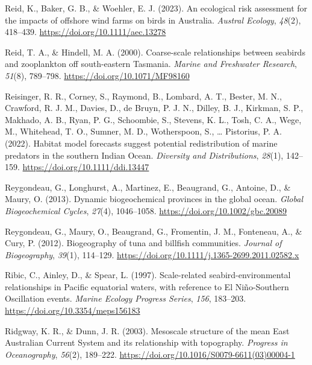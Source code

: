 \documentclass{article}
\newlength{\cslhangindent}
\newlength{\cslentryspacingunit} %
\newenvironment{CSLReferences}[2] %
 {%
  \setlength{\parindent}{0pt}
  \ifodd #1
  \let\oldpar\par
  \def\par{\hangindent=\cslhangindent\oldpar}
  \fi
  \setlength{\parskip}{#2\cslentryspacingunit}
 }%
 {}
\begin{document}
\begin{linenumbers}
\begin{CSLReferences}{1}{0}
\leavevmode{}%
Reid, K., Baker, G. B., \& Woehler, E. J. (2023). An ecological risk assessment for the impacts of offshore wind farms on birds in Australia. \emph{Austral Ecology}, \emph{48}(2), 418--439. \url{https://doi.org/10.1111/aec.13278}

\leavevmode{}%
Reid, T. A., \& Hindell, M. A. (2000). Coarse-scale relationships between seabirds and zooplankton off south-eastern Tasmania. \emph{Marine and Freshwater Research}, \emph{51}(8), 789--798. \url{https://doi.org/10.1071/MF98160}

\leavevmode{}%
Reisinger, R. R., Corney, S., Raymond, B., Lombard, A. T., Bester, M. N., Crawford, R. J. M., Davies, D., de Bruyn, P. J. N., Dilley, B. J., Kirkman, S. P., Makhado, A. B., Ryan, P. G., Schoombie, S., Stevens, K. L., Tosh, C. A., Wege, M., Whitehead, T. O., Sumner, M. D., Wotherspoon, S., \ldots{} Pistorius, P. A. (2022). Habitat model forecasts suggest potential redistribution of marine predators in the southern Indian Ocean. \emph{Diversity and Distributions}, \emph{28}(1), 142--159. \url{https://doi.org/10.1111/ddi.13447}

\leavevmode{}%
Reygondeau, G., Longhurst, A., Martinez, E., Beaugrand, G., Antoine, D., \& Maury, O. (2013). Dynamic biogeochemical provinces in the global ocean. \emph{Global Biogeochemical Cycles}, \emph{27}(4), 1046--1058. \url{https://doi.org/10.1002/gbc.20089}

\leavevmode{}%
Reygondeau, G., Maury, O., Beaugrand, G., Fromentin, J. M., Fonteneau, A., \& Cury, P. (2012). Biogeography of tuna and billfish communities. \emph{Journal of Biogeography}, \emph{39}(1), 114--129. \url{https://doi.org/10.1111/j.1365-2699.2011.02582.x}

\leavevmode{}%
Ribic, C., Ainley, D., \& Spear, L. (1997). Scale-related seabird-environmental relationships in Pacific equatorial waters, with reference to El Niño-Southern Oscillation events. \emph{Marine Ecology Progress Series}, \emph{156}, 183--203. \url{https://doi.org/10.3354/meps156183}

\leavevmode{}%
Ridgway, K. R., \& Dunn, J. R. (2003). Mesoscale structure of the mean East Australian Current System and its relationship with topography. \emph{Progress in Oceanography}, \emph{56}(2), 189--222. \url{https://doi.org/10.1016/S0079-6611(03)00004-1}


\end{CSLReferences}
\end{linenumbers}
\end{document}

